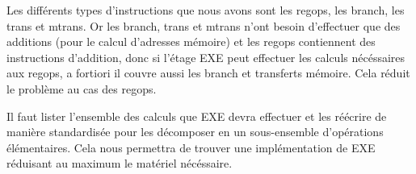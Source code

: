 \documentclass{article}
\begin{document}
\par
Les différents types d'instructions que nous avons sont les regops, les branch, les trans et mtrans.
Or les branch, trans et mtrans n'ont besoin d'effectuer que des additions (pour le calcul d'adresses
mémoire) et les regops contiennent des instructions d'addition, donc si l'étage EXE peut effectuer
les calculs nécéssaires aux regops, a fortiori il couvre aussi les branch et transferts mémoire.
Cela réduit le problème au cas des regops.

\par
Il faut lister l'ensemble des calculs que EXE devra effectuer et les réécrire
de manière standardisée pour les décomposer en un sous-ensemble d'opérations élémentaires.
Cela nous permettra de trouver une implémentation de EXE réduisant au maximum le matériel nécéssaire.
\end{document}
